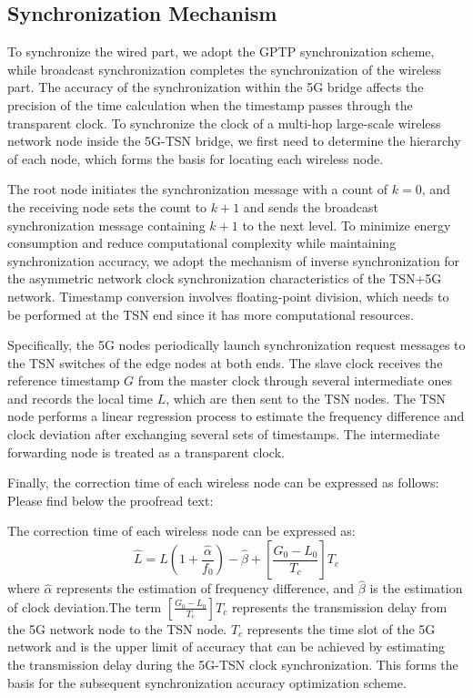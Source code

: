 \documentclass[english]{cccconf}
\begin{document}
\subsection{Synchronization Mechanism}
To synchronize the wired part, we adopt the GPTP synchronization scheme, while broadcast synchronization completes the synchronization of the wireless part. The accuracy of the synchronization within the 5G bridge affects the precision of the time calculation when the timestamp passes through the transparent clock. To synchronize the clock of a multi-hop large-scale wireless network node inside the 5G-TSN bridge, we first need to determine the hierarchy of each node, which forms the basis for locating each wireless node.

The root node initiates the synchronization message with a count of $k=0$, and the receiving node sets the count to $k+1$ and sends the broadcast synchronization message containing $k+1$ to the next level. To minimize energy consumption and reduce computational complexity while maintaining synchronization accuracy, we adopt the mechanism of inverse synchronization for the asymmetric network clock synchronization characteristics of the TSN+5G network\cite{8935413}. Timestamp conversion involves floating-point division, which needs to be performed at the TSN end since it has more computational resources.

Specifically, the 5G nodes periodically launch synchronization request messages to the TSN switches of the edge nodes at both ends. The slave clock receives the reference timestamp $G$ from the master clock through several intermediate ones and records the local time $L$, which are then sent to the TSN nodes. The TSN node performs a linear regression process to estimate the frequency difference and clock deviation after exchanging several sets of timestamps. The intermediate forwarding node is treated as a transparent clock.

Finally, the correction time of each wireless node can be expressed as follows:
Please find below the proofread text:

The correction time of each wireless node can be expressed as:
\begin{equation}
	\widehat{L}=L\left(1+\frac{\widehat{\alpha}}{f_0}\right)-\widehat{\beta}+\left[\frac{G_0-L_0}{T_c}\right] T_c
\end{equation}
where $\widehat{\alpha}$ represents the estimation of frequency difference, and $\widehat{\beta}$ is the estimation of clock deviation.The term $[\frac{G_0-L_0}{T_c}] T_c$ represents the transmission delay from the 5G network node to the TSN node. $T_c$ represents the time slot of the 5G network and is the upper limit of accuracy that can be achieved by estimating the transmission delay during the 5G-TSN clock synchronization. This forms the basis for the subsequent synchronization accuracy optimization scheme.
\end{document}
